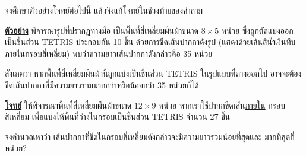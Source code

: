 \question{}

จงศึกษาตัวอย่างโจทย์ต่อไปนี้ แล้วจึงแก้โจทย์ในช่วงท้ายของคำถาม


\smallskip\noindent
\textbf{\uline{ตัวอย่าง}} พิจารณารูปที่ปรากฏทางมือ 
เป็นพื้นที่สี่เหลี่ยมผืนผ้าขนาด $\mathrm{8 \times 5}$ หน่วย 
ซึ่งถูกตัดแบ่งออกเป็นชิ้นส่วน TETRIS{\textregistered} ประกอบกัน 10 ชิ้น ด้วยการขีดเส้นปากกาดังรูป
(แสดงด้วยเส้นสีน้ำเงินทึบภายในกรอบสี่เหลี่ยม)\; พบว่าความยาวเส้นปากกาดังกล่าวคือ 35 หน่วย\hrsp%

สังเกตว่า หากพื้นที่สี่เหลี่ยมผืนผ้านี้ถูกแบ่งเป็นชิ้นส่วน TETRIS{\textregistered} ในรูปแบบที่ต่างออกไป 
อาจจะต้องขีดเส้นปากกาที่มีความยาวรวมมากกว่าหรือน้อยกว่า 35 หน่วยก็ได้

\smallskip\noindent
\textbf{\uline{โจทย์}}\; ให้พิจารณาพื้นที่สี่เหลี่ยมผืนผ้าขนาด $\mathrm{12 \times 9}$ หน่วย 
หากเราใช้ปากกขีดเส้น\uline{ภายใน}
กรอบสี่เหลี่ยม เพื่อแบ่งให้พื้นที่ว่างในกรอบเป็นชิ้นส่วน TETRIS{\textregistered} จำนวน 27 ชิ้น

จงคำนวณหาว่า เส้นปากกาที่ขีดในกรอบสี่เหลี่ยมดังกล่าวจะมีความยาวรวม\uline{น้อยที่สุด}และ
\uline{มากที่สุด}กี่หน่วย?

